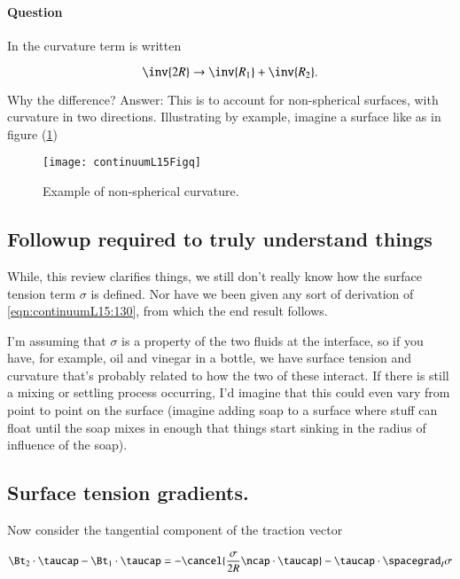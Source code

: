 \paragraph{Question} In \cite{landau1987course} the curvature term is written

\begin{equation}\label{eqn:continuumL15:70}
\inv{2 R} \rightarrow \inv{R_1} + \inv{R_2}.
\end{equation}

Why the difference?  Answer: This is to account for non-spherical surfaces, with curvature in two directions.  Illustrating by example, imagine a surface like as in figure (\ref{fig:continuumL15:continuumL15Figq})
\begin{figure}[htp]
   \centering
   \texttt{[image: continuumL15Figq]}
   \caption{Example of non-spherical curvature.}\label{fig:continuumL15:continuumL15Figq}
\end{figure}

\subsection{Followup required to truly understand things}

While, this review clarifies things, we still don't really know how the surface tension term $\sigma$ is defined.  Nor have we been given any sort of derivation of \ref{eqn:continuumL15:130}, from which the end result follows.

I'm assuming that $\sigma$ is a property of the two fluids at the interface, so if you have, for example, oil and vinegar in a bottle, we have surface tension and curvature that's probably related to how the two of these interact.  If there is still a mixing or settling process occurring, I'd imagine that this could even vary from point to point on the surface (imagine adding soap to a surface where stuff can float until the soap mixes in enough that things start sinking in the radius of influence of the soap).

\subsection{Surface tension gradients.}

Now consider the tangential component of the traction vector

\begin{equation}\label{eqn:continuumL15:90}
\Bt_2 \cdot \taucap - \Bt_1 \cdot \taucap = - \cancel{ \frac{\sigma}{2 R} \ncap \cdot \taucap} - \taucap \cdot \spacegrad_I \sigma
\end{equation}

